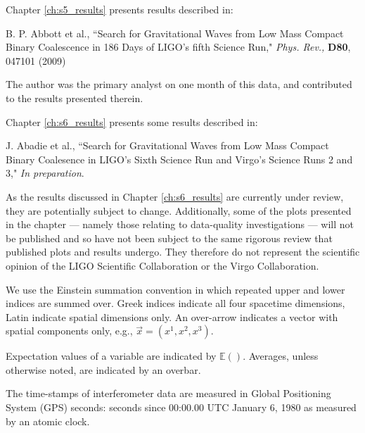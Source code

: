 \documentclass[12pt,notitlepage]{report}
\begin{document}
\noindent Chapter \ref{ch:s5_results} presents results described in:

\vspace*{0.25cm}
\noindent B. P. Abbott et al., ``Search for Gravitational Waves from Low Mass Compact Binary Coalescence in 186 Days of LIGO's fifth Science Run," {\it Phys. Rev.,} {\bf D80}, 047101 (2009)

\vspace*{0.25cm}
\noindent The author was the primary analyst on one month of this data, and contributed to the results presented therein.

\vspace*{0.5cm}
\noindent Chapter \ref{ch:s6_results} presents some results described in:

\vspace*{0.25cm}
\noindent J. Abadie et al., ``Search for Gravitational Waves from Low Mass Compact Binary Coalesence in LIGO's Sixth Science Run and Virgo's Science Runs 2 and 3," {\it In preparation}.

\vspace*{0.25cm}
\noindent As the results discussed in Chapter \ref{ch:s6_results} are currently under review, they are potentially subject to change. Additionally, some of the plots presented in the chapter --- namely those relating to data-quality investigations --- will not be published and so have not been subject to the same rigorous review that published plots and results undergo. They therefore do not represent the scientific opinion of the LIGO Scientific Collaboration or the Virgo Collaboration.


We use the Einstein summation convention in which repeated upper and lower
indices are summed over. Greek indices indicate all four spacetime dimensions,
Latin indicate spatial dimensions only. An over-arrow indicates a vector with
spatial components only, e.g., $\vec{x} = (x^1,x^2,x^3)$.

\vspace{0.5cm}

\noindent Expectation values of a variable are indicated by $\mathbb{E}()$.
Averages, unless otherwise noted, are indicated by an overbar.

\vspace{0.5cm}

\noindent The time-stamps of interferometer data are measured in
Global Positioning System (GPS) seconds: seconds since 00:00.00 UTC
January 6, 1980 as measured by an atomic clock.
\end{document}
